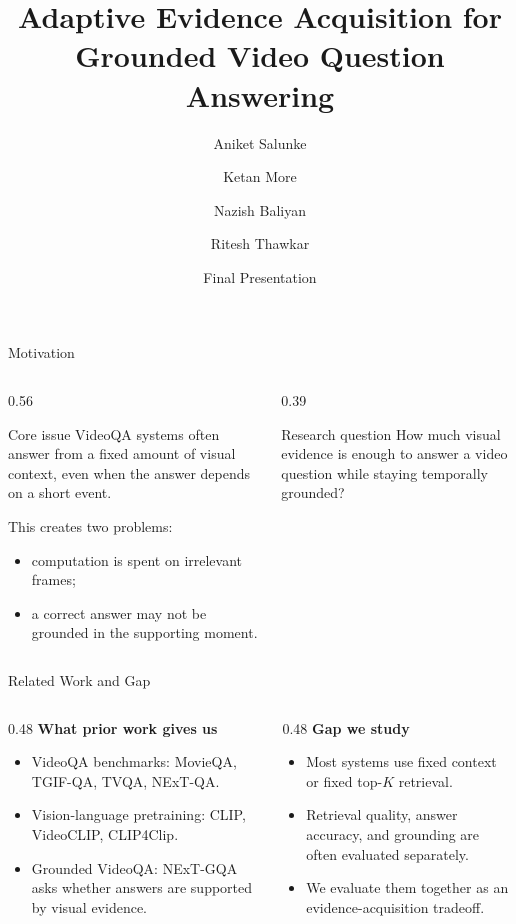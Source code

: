 \documentclass[aspectratio=169]{beamer}
\title[Adaptive Evidence for Grounded VideoQA]{Adaptive Evidence Acquisition for Grounded Video Question Answering}
\author{Aniket Salunke \and Ketan More \and Nazish Baliyan \and Ritesh Thawkar}
\institute{Mohamed Bin Zayed University of Artificial Intelligence}
\date{Final Presentation}
\begin{document}
\begin{frame}
  \titlepage
\end{frame}

\begin{frame}{Motivation}
  \begin{columns}[T,onlytextwidth]
    \begin{column}{0.56\textwidth}
      \begin{block}{Core issue}
        VideoQA systems often answer from a fixed amount of visual context, even when the answer depends on a short event.
      \end{block}
      \vspace{0.5em}
      This creates two problems:
      \begin{itemize}
        \item computation is spent on irrelevant frames;
        \item a correct answer may not be grounded in the supporting moment.
      \end{itemize}
    \end{column}
    \begin{column}{0.39\textwidth}
      \begin{block}{Research question}
        How much visual evidence is enough to answer a video question while staying temporally grounded?
      \end{block}
    \end{column}
  \end{columns}
\end{frame}

\begin{frame}{Related Work and Gap}
  \begin{columns}[T,onlytextwidth]
    \begin{column}{0.48\textwidth}
      \textbf{What prior work gives us}
      \begin{itemize}
        \item VideoQA benchmarks: MovieQA, TGIF-QA, TVQA, NExT-QA.
        \item Vision-language pretraining: CLIP, VideoCLIP, CLIP4Clip.
        \item Grounded VideoQA: NExT-GQA asks whether answers are supported by visual evidence.
      \end{itemize}
    \end{column}
    \begin{column}{0.48\textwidth}
      \textbf{Gap we study}
      \begin{itemize}
        \item Most systems use fixed context or fixed top-$K$ retrieval.
        \item Retrieval quality, answer accuracy, and grounding are often evaluated separately.
        \item We evaluate them together as an evidence-acquisition tradeoff.
      \end{itemize}
    \end{column}
  \end{columns}
\end{frame}
\end{document}
